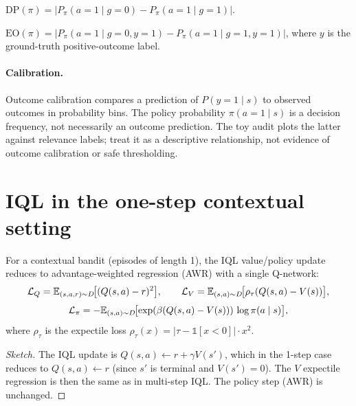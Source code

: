 \documentclass[11pt,oneside]{scrbook}
\begin{document}
\begin{definition}
$\mathrm{DP}(\pi) = | P_\pi(a = 1 \mid g = 0) - P_\pi(a = 1 \mid g = 1)|$.
\end{definition}

\begin{definition}
$\mathrm{EO}(\pi) = | P_\pi(a = 1 \mid g = 0, y = 1) - P_\pi(a = 1 \mid g = 1, y = 1)|$,
where $y$ is the ground-truth positive-outcome label.
\end{definition}

\paragraph{Calibration.}
Outcome calibration compares a prediction of $P(y=1\mid s)$ to observed
outcomes in probability bins. The policy probability $\pi(a=1\mid s)$ is a
decision frequency, not necessarily an outcome prediction. The toy audit
plots the latter against relevance labels; treat it as a descriptive
relationship, not evidence of outcome calibration or safe thresholding.

\section{IQL in the one-step contextual setting}

\begin{theorem}\label{thm:iql-1step}
For a contextual bandit (episodes of length 1), the IQL value/policy update
reduces to advantage-weighted regression (AWR) with a single Q-network:
\[
   \mathcal{L}_Q = \mathbb{E}_{(s,a,r) \sim D}\!\bigl[ (Q(s, a) - r)^2 \bigr], \qquad
   \mathcal{L}_V = \mathbb{E}_{(s,a) \sim D}\!\bigl[ \rho_\tau(Q(s,a) - V(s)) \bigr],
\]
\[
   \mathcal{L}_\pi = -\mathbb{E}_{(s, a) \sim D}\!\bigl[ \exp(\beta (Q(s, a) - V(s)))\,
                                                 \log \pi(a \mid s)\bigr],
\]
where $\rho_\tau$ is the expectile loss
$\rho_\tau(x) = |\tau - \mathbb{1}[x < 0]|\cdot x^2$.
\end{theorem}

\begin{proof}[Sketch]
The IQL update is $Q(s, a) \leftarrow r + \gamma V(s')$, which in the 1-step
case reduces to $Q(s, a) \leftarrow r$ (since $s'$ is terminal and $V(s') = 0$).
The $V$ expectile regression is then the same as in multi-step IQL. The
policy step (AWR) is unchanged.
\end{proof}
\end{document}
